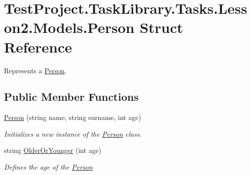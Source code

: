 \hypertarget{struct_test_project_1_1_task_library_1_1_tasks_1_1_lesson2_1_1_models_1_1_person}{}\section{Test\+Project.\+Task\+Library.\+Tasks.\+Lesson2.\+Models.\+Person Struct Reference}
\label{struct_test_project_1_1_task_library_1_1_tasks_1_1_lesson2_1_1_models_1_1_person}


Represents a \mbox{\hyperlink{struct_test_project_1_1_task_library_1_1_tasks_1_1_lesson2_1_1_models_1_1_person}{Person}}.  


\subsection*{Public Member Functions}
\begin{DoxyCompactItemize}
\item 
\mbox{\hyperlink{struct_test_project_1_1_task_library_1_1_tasks_1_1_lesson2_1_1_models_1_1_person_a871eb59524d075f00786e254b99970e7}{Person}} (string name, string surname, int age)
\begin{DoxyCompactList}\small\item\em Initializes a new instance of the \mbox{\hyperlink{struct_test_project_1_1_task_library_1_1_tasks_1_1_lesson2_1_1_models_1_1_person}{Person}} class. \end{DoxyCompactList}\item 
string \mbox{\hyperlink{struct_test_project_1_1_task_library_1_1_tasks_1_1_lesson2_1_1_models_1_1_person_a8f6a36b94dbcbffb42427f3bd665c44a}{Older\+Or\+Younger}} (int age)
\begin{DoxyCompactList}\small\item\em Defines the age of the \mbox{\hyperlink{struct_test_project_1_1_task_library_1_1_tasks_1_1_lesson2_1_1_models_1_1_person}{Person}} \end{DoxyCompactList}\end{DoxyCompactItemize}
